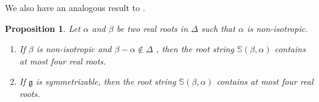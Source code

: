 \documentclass[11pt,reqno]{amsart}
\theoremstyle{plain}
\newtheorem*{prop}{Proposition}
\theoremstyle{definition}
\theoremstyle{remark}
\newcommand{\lie}[1]{\mathfrak{#1}}
\numberwithin{equation}{section}
\begin{document}
We also have an analogous result to \cite[Exercise 5.14]{Kac90Infinite}.

\begin{prop}\label{prop32}
    Let $\alpha$ and $\beta$ be two real roots in $\Delta$ such that $\alpha$ is non-isotropic.
    \begin{enumerate}
        \item If $\beta$ is non-isotropic and $\beta-\alpha\notin \Delta$ , then the root string $\mathbb{S}(\beta,\alpha)$ contains at most four real roots. \vspace{0,1cm}
        \item If $\lie g$ is symmetrizable, then the root string $\mathbb{S}(\beta,\alpha)$ contains at most four real roots.
    \end{enumerate}
    
\end{prop}
\end{document}
